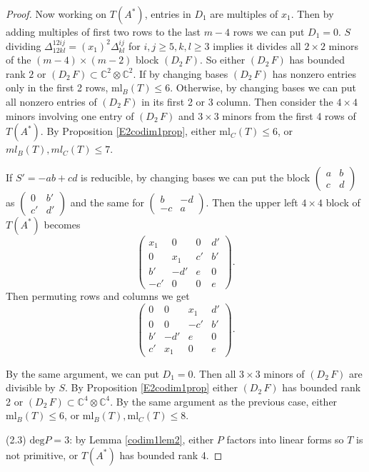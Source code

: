 \documentclass[10pt]{article} %
\newcommand{\ml}{\mathrm{ml}}
\theoremstyle{definition}
\begin{document}
\begin{proof}
Now working on $T(A^*)$, entries in $D_1$ are multiples of $x_1$. Then by adding multiples of first two rows to the last $m-4$ rows we can put $D_1=0$. $S$ dividing $\Delta^{12ij}_{12kl}=(x_1)^2\Delta^{ij}_{kl}$ for $i,j\geq 5,k,l\geq 3$ implies it divides all $2\times 2$ minors of the $(m-4)\times(m-2)$ block $(D_2\,F)$. So either $(D_2\,F)$ has bounded rank $2$ or $(D_2\,F)\subset \mathbb{C}^2\otimes\mathbb{C}^2$. If by changing bases $(D_2\,F)$ has nonzero entries only in the first 2 rows, $\ml_B(T)\leq 6$. Otherwise, by changing bases we can put all nonzero entries of $(D_2\,F)$ in its first 2 or 3 column. Then consider the $4\times 4$ minors involving one entry of $(D_2\,F)$ and $3\times 3$ minors from the first 4 rows of $T(A^*)$. By Proposition \ref{E2codim1prop}, either $\ml_C(T)\leq 6$, or $ml_B(T),ml_C(T)\leq 7$.

If $S'=-ab+cd$ is reducible, by changing bases we can put the block 
$\begin{pmatrix}
a & b\\
c & d
\end{pmatrix}$ as 
$\begin{pmatrix}
0 & b'\\
c' & d'
\end{pmatrix}$ and the same for $\begin{pmatrix}
b & -d\\
-c & a
\end{pmatrix}$. Then the upper left $4\times 4$ block of $T(A^*)$ becomes
$$\begin{pmatrix}
x_1& 0 &0& d'\\
0& x_1 &c'& b'\\
b'& -d'&e& 0\\
-c'& 0&0& e
\end{pmatrix}.$$
Then permuting rows and columns we get
$$\begin{pmatrix}
0& 0 &x_1& d'\\
0& 0 &-c'& b'\\
b'& -d'&e& 0\\
c'& x_1&0& e
\end{pmatrix}.$$

By the same argument, we can put $D_1=0$. Then all $3\times 3$ minors of $(D_2\,F)$ are divisible by $S$. By Proposition \ref{E2codim1prop} either $(D_2\,F)$ has bounded rank 2 or $(D_2\,F)\subset\mathbb{C}^4\otimes\mathbb{C}^4$. By the same argument as the previous case, either $\ml_B(T)\leq 6$, or $\ml_B(T),\ml_C(T)\leq 8$.

(2.3) $\mathrm{deg}P=3$: by Lemma \ref{codim1lem2}, either $P$ factors into linear forms so $T$ is not primitive, or $T(A^*)$ has bounded rank 4.


\end{proof}
\end{document}
